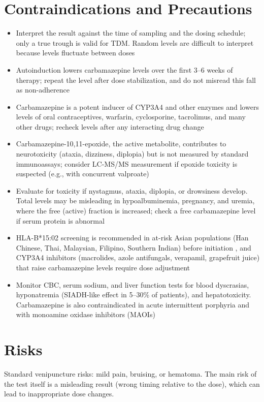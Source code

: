 \section*{Contraindications and Precautions}
\begin{itemize}
  \item Interpret the result against the time of sampling and the dosing schedule; only a true trough is valid for TDM. Random levels are difficult to interpret because levels fluctuate between doses
  \item Autoinduction lowers carbamazepine levels over the first 3--6 weeks of therapy; repeat the level after dose stabilization, and do not misread this fall as non-adherence
  \item Carbamazepine is a potent inducer of CYP3A4 and other enzymes and lowers levels of oral contraceptives, warfarin, cyclosporine, tacrolimus, and many other drugs; recheck levels after any interacting drug change
  \item Carbamazepine-10,11-epoxide, the active metabolite, contributes to neurotoxicity (ataxia, dizziness, diplopia) but is not measured by standard immunoassays; consider LC-MS/MS measurement if epoxide toxicity is suspected (e.g., with concurrent valproate)
  \item Evaluate for toxicity if nystagmus, ataxia, diplopia, or drowsiness develop. Total levels may be misleading in hypoalbuminemia, pregnancy, and uremia, where the free (active) fraction is increased; check a free carbamazepine level if serum protein is abnormal
  \item HLA-B*15:02 screening is recommended in at-risk Asian populations (Han Chinese, Thai, Malaysian, Filipino, Southern Indian) before initiation \cite{chung2004}, and CYP3A4 inhibitors (macrolides, azole antifungals, verapamil, grapefruit juice) that raise carbamazepine levels require dose adjustment
  \item Monitor CBC, serum sodium, and liver function tests for blood dyscrasias, hyponatremia (SIADH-like effect in 5--30\% of patients), and hepatotoxicity. Carbamazepine is also contraindicated in acute intermittent porphyria and with monoamine oxidase inhibitors (MAOIs)
\end{itemize}
\section*{Risks}
Standard venipuncture risks: mild pain, bruising, or hematoma. The main risk of the test itself is a misleading result (wrong timing relative to the dose), which can lead to inappropriate dose changes.

